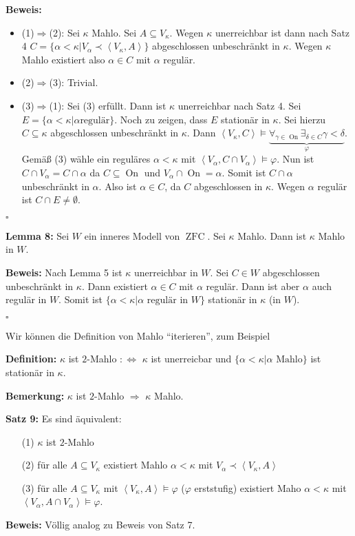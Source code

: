 \documentclass[a4paper,fontsize=11pt]{scrartcl}
\newcommand{\ZFC}{\operatorname{ZFC}}
\newcommand{\On}{\operatorname{On}}
\begin{document}
{\bf Beweis:}
\begin{itemize}
\item (1)$\Rightarrow$(2): Sei $\kappa$ Mahlo. Sei $A\subseteq
  V_\kappa$. Wegen $\kappa$ unerreichbar ist dann nach Satz 4
  $C=\{\alpha<\kappa|V_\alpha\prec\left<V_\kappa,A\right>\}$
    abgeschlossen unbeschränkt in $\kappa$. Wegen $\kappa$ Mahlo
    existiert also $\alpha\in C$ mit $\alpha$ regulär.
\item (2)$\Rightarrow$(3): Trivial.
\item (3)$\Rightarrow$(1): Sei (3) erfüllt. Dann ist $\kappa$
  unerreichbar nach Satz 4. Sei $E=\{\alpha<\kappa|\alpha\mbox{
    regulär}\}$. Noch zu zeigen, dass $E$ stationär in $\kappa$. Sei
  hierzu $C\subseteq\kappa$ abgeschlossen unbeschränkt in
  $\kappa$. Dann
  $\left<V_\kappa,C\right>\models\underbrace{\forall_{\gamma\in\On}\exists_{\delta\in
      C}\gamma<\delta}_\varphi$. Gemäß (3) wähle ein reguläres
  $\alpha<\kappa$ mit $\left<V_\alpha,C\cap
  V_\alpha\right>\models\varphi$. Nun ist $C\cap V_\alpha=C\cap\alpha$
  da $C\subseteq\On$ und $V_\alpha\cap\On=\alpha$. Somit ist
  $C\cap\alpha$ unbeschränkt in $\alpha$. Also ist $\alpha\in C$, da
  $C$ abgeschlossen in $\kappa$. Wegen $\alpha$ regulär ist $C\cap
  E\neq\emptyset$.
\end{itemize}
\hfill $\square$

{\bf Lemma 8:} Sei $W$ ein inneres Modell von $\ZFC$. Sei $\kappa$
Mahlo. Dann ist $\kappa$ Mahlo in $W$.

{\bf Beweis:} Nach Lemma 5 ist $\kappa$ unerreichbar in $W$. Sei $C\in
W$ abgeschlossen unbeschränkt in $\kappa$. Dann existiert $\alpha\in
C$ mit $\alpha$ regulär. Dann ist aber $\alpha$ auch regulär in
$W$. Somit ist $\{\alpha<\kappa|\alpha\mbox{ regulär in }W\}$
stationär in $\kappa$ (in $W$).

\hfill $\square$

Wir können die Definition von Mahlo ``iterieren'', zum Beispiel

{\bf Definition:} $\kappa$ ist $2$-Mahlo $:\Leftrightarrow$ $\kappa$
ist unerreicbar und $\{\alpha<\kappa|\alpha\mbox{ Mahlo}\}$ ist
stationär in $\kappa$.

{\bf Bemerkung:} $\kappa$ ist $2$-Mahlo $\Rightarrow$ $\kappa$ Mahlo.

{\bf Satz 9:} Es sind äquivalent:
\begin{itemize}
\item[(1)] $\kappa$ ist $2$-Mahlo
\item[(2)] für alle $A\subseteq V_\kappa$ existiert Mahlo
  $\alpha<\kappa$ mit $V_\alpha\prec\left<V_\kappa,A\right>$
\item[(3)] für alle $A\subseteq V_\kappa$ mit
  $\left<V_\kappa,A\right>\models\varphi$ ($\varphi$ erststufig)
  existiert Maho $\alpha<\kappa$ mit $\left<V_\alpha,A\cap
  V_\alpha\right>\models\varphi$.
\end{itemize}
{\bf Beweis:} Völlig analog zu Beweis von Satz 7.
\end{document}
